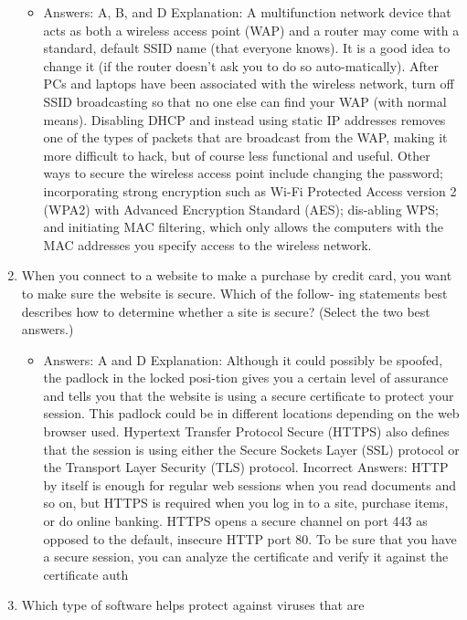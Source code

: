 \documentclass{article}
\begin{document}
\begin{enumerate}
\begin{itemize}
         \item  Answers: A, B, and D                Explanation:        A multifunction network device that acts as both a wireless access point (WAP) and a router may come with a standard, default SSID name (that everyone knows). It is a good idea to change it (if the router doesn’t ask you to do so auto-matically). After PCs and laptops have been associated with the wireless network, turn off SSID broadcasting so that no one else can find your WAP (with normal means). Disabling DHCP and instead using static IP addresses removes one of the types of packets that are broadcast from the WAP, making it more difficult to hack, but of course less functional and useful. Other ways to secure the wireless access point include changing the password; incorporating strong encryption such as Wi-Fi Protected Access version 2 (WPA2) with Advanced Encryption Standard (AES); dis-abling WPS; and initiating MAC filtering, which only allows the computers with the MAC addresses you specify access to the wireless network.
     \end{itemize}
     \item When you connect to a website to make a purchase by credit card,
you want to make sure the website is secure. Which of the follow-
ing statements best describes how to determine whether a site is
secure? (Select the two best answers.)
     \begin{itemize}
         \item   Answers: A and D                Explanation:        Although it could possibly be spoofed, the padlock in the locked posi-tion gives you a certain level of assurance and tells you that the website is using a secure certificate to protect your session. This padlock could be in different locations depending on the web browser used. Hypertext Transfer Protocol Secure (HTTPS) also defines that the session is using either the Secure Sockets Layer (SSL) protocol or the Transport Layer Security (TLS) protocol.                Incorrect        Answers:        HTTP by itself is enough for regular web sessions when you read documents and so on, but HTTPS is required when you log in to a site, purchase items, or do online banking. HTTPS opens a secure channel on port 443 as opposed to the default, insecure HTTP port 80. To be sure that you have a secure session, you can analyze the certificate and verify it against the certificate auth
     \end{itemize}
     \item Which type of software helps protect against viruses that are

\end{enumerate}
\end{document}
